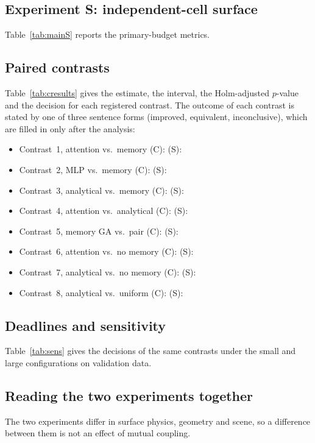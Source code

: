 \documentclass[conference]{IEEEtran}
\begin{document}
\subsection{Experiment S: independent-cell surface}
Table~\ref{tab:mainS} reports the primary-budget metrics. \resSpeDiscussion

\subsection{Paired contrasts}
Table~\ref{tab:cresults} gives the estimate, the interval, the Holm-adjusted $p$-value and the decision for each registered contrast. The outcome of each contrast is stated by one of three sentence forms (improved, equivalent, inconclusive), which are filled in only after the analysis:
\begin{itemize}\setlength\itemsep{0pt}
\item Contrast~1, attention vs.\ memory (C): \resCplSAttMem{} (S): \resSpeSAttMem
\item Contrast~2, MLP vs.\ memory (C): \resCplSMlpMem{} (S): \resSpeSMlpMem
\item Contrast~3, analytical vs.\ memory (C): \resCplSAnaMem{} (S): \resSpeSAnaMem
\item Contrast~4, attention vs.\ analytical (C): \resCplSAttAna{} (S): \resSpeSAttAna
\item Contrast~5, memory GA vs.\ pair (C): \resCplSMemPair{} (S): \resSpeSMemPair
\item Contrast~6, attention vs.\ no memory (C): \resCplSAttNoMem{} (S): \resSpeSAttNoMem
\item Contrast~7, analytical vs.\ no memory (C): \resCplSAnaNoMem{} (S): \resSpeSAnaNoMem
\item Contrast~8, analytical vs.\ uniform (C): \resCplSAnaUni{} (S): \resSpeSAnaUni
\end{itemize}

\subsection{Deadlines and sensitivity}
\resDeadlineSummary{} Table~\ref{tab:sens} gives the decisions of the same contrasts under the small and large configurations on validation data. \resSensitivitySummary

\subsection{Reading the two experiments together}
\resCrossDiscussion{} The two experiments differ in surface physics, geometry and scene, so a difference between them is not an effect of mutual coupling.
\end{document}
